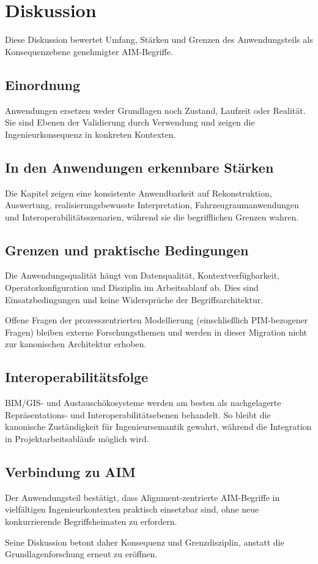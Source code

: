 \chapter{Diskussion}
\label{chap:applications-discussion}

Diese Diskussion bewertet Umfang, Stärken und Grenzen des Anwendungsteils
als Konsequenzebene genehmigter AIM-Begriffe.

\section{Einordnung}

Anwendungen ersetzen weder Grundlagen noch Zustand, Laufzeit oder
Realität. Sie sind Ebenen der Validierung durch Verwendung und zeigen die
Ingenieurkonsequenz in konkreten Kontexten.

\section{In den Anwendungen erkennbare Stärken}

Die Kapitel zeigen eine konsistente Anwendbarkeit auf Rekonstruktion,
Auswertung, realisierungsbewusste Interpretation,
Fahrzeugraumanwendungen und Interoperabilitätsszenarien, während sie die
begrifflichen Grenzen wahren.

\section{Grenzen und praktische Bedingungen}

Die Anwendungsqualität hängt von Datenqualität, Kontextverfügbarkeit,
Operatorkonfiguration und Disziplin im Arbeitsablauf ab. Dies sind
Einsatzbedingungen und keine Widersprüche der Begriffsarchitektur.

Offene Fragen der prozesszentrierten Modellierung (einschließlich
PIM-bezogener Fragen) bleiben externe Forschungsthemen und werden in
dieser Migration nicht zur kanonischen Architektur erhoben.

\section{Interoperabilitätsfolge}

BIM/GIS- und Austauschökosysteme werden am besten als nachgelagerte
Repräsentations- und Interoperabilitätsebenen behandelt. So bleibt die
kanonische Zuständigkeit für Ingenieursemantik gewahrt, während die
Integration in Projektarbeitsabläufe möglich wird.

\section{Verbindung zu AIM}
\begin{summary}
Der Anwendungsteil bestätigt, dass Alignment-zentrierte AIM-Begriffe in
vielfältigen Ingenieurkontexten praktisch einsetzbar sind, ohne neue
konkurrierende Begriffsheimaten zu erfordern.

Seine Diskussion betont daher Konsequenz und Grenzdisziplin, anstatt die
Grundlagenforschung erneut zu eröffnen.
\end{summary}
